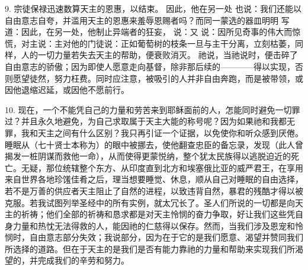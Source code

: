 9. 宗徒保禄迅速数算天主的恩惠，以结束。 因此，他在另一处 也说：\newline{}我们还能以自由意志自夸，并滥用天主的恩惠来羞辱恩赐者吗？而同一蒙选的器皿明明 写道：因此，在另一处，他制止异端者的狂妄， 说：又 说：因所见奇事的伟大而惊慌，对主说：主对他的门徒说：正如葡萄树的枝条一旦与主干分离，立刻枯萎，同样，人的一切力量若失去天主的帮助，便衰败消灭。  祂说，当祂说时，便击碎了自由意志的骄傲；因为即使人愿意走向基督，除非那后续的————得以实现，否则愿望徒然，努力枉费。同时应注意，被吸引的人并非自由奔跑，而是被带领，或因他退缩迟延，或因他不愿前行。\par

10. 现在，一个不能凭自己的力量和劳苦来到耶稣面前的人，怎能同时避免一切罪过？并且永久地避免，为自己求取属于天主大能的称号呢？因为如果祂和我都无罪，我和天主之间有什么区别？我只再引证一个证据，以免使你和听众感到厌倦。 睡眠从（七十贤士本称为）的眼中被挪去，使他翻查忠臣的备忘录，发现（此人曾揭发一桩阴谋而救他一命），从而使得更蒙悦纳，整个犹太民族得以逃脱迫近的死亡。无疑，那位统辖整个东方、从印度直到北方和埃塞俄比亚的威严君王，在享用来自世界各地珍馐佳肴之后，理当想要睡觉、休息，顺从自己对睡眠的自由选择，若不是万善的供应者天主阻止了自然的进程，以致违背自然，暴君的残酷才得以被克服。若我试图列举圣经中的所有实例，就太冗长了。圣人们所说的一切都是向天主的祈祷；他们全部的祈祷和恳求都是对天主怜悯的奋力争取，好让我们这些凭自身力量和热忱无法得救的人，能因祂的仁慈得以保存。然而，当我们涉及恩宠和怜悯时，自由意志部分失效；我说部分，因为在于它的是我们愿意、渴望并赞同我们所选择的道路。但在于天主的是我们是否有能力靠祂的力量和帮助来实现我们所渴望的，并完成我们的辛劳和努力。\par

